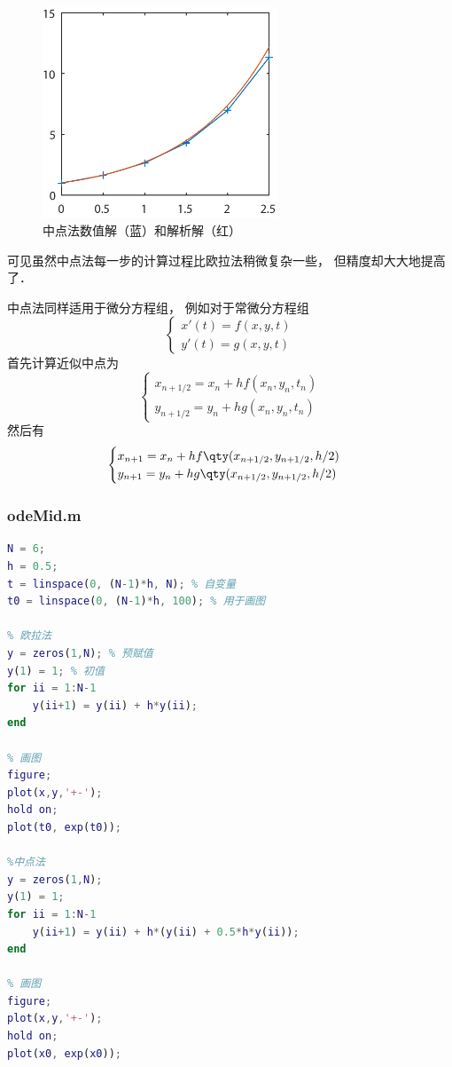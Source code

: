 \begin{figure}[ht]
\centering
\includegraphics[width=7cm]{./figures/OdeMid_2.pdf}
\caption{中点法数值解（蓝）和解析解（红）} \label{OdeMid_fig2}
\end{figure}

可见虽然中点法每一步的计算过程比欧拉法稍微复杂一些， 但精度却大大地提高了． 

中点法同样适用于微分方程组， 例如对于常微分方程组
\begin{equation}
\begin{cases}
x'(t) = f(x, y, t)\\
y'(t) = g(x, y, t)
\end{cases}
\end{equation}
首先计算近似中点为
\begin{equation}
\begin{cases}
x_{n+1/2} = x_n + h f(x_n, y_n, t_n)\\
y_{n+1/2} = y_n + h g(x_n, y_n, t_n)
\end{cases}
\end{equation}
然后有
\begin{equation}\label{OdeMid_eq7}
\begin{cases}
x_{n+1} = x_n + h f \qty(x_{n+1/2}, y_{n+1/2}, h/2)\\
y_{n+1} = y_n + h g \qty(x_{n+1/2}, y_{n+1/2}, h/2)
\end{cases}
\end{equation}

\subsubsection{odeMid.m}
\begin{lstlisting}[language=matlab]
% 设置参数
N = 6;
h = 0.5;
t = linspace(0, (N-1)*h, N); % 自变量
t0 = linspace(0, (N-1)*h, 100); % 用于画图

% 欧拉法
y = zeros(1,N); % 预赋值
y(1) = 1; % 初值
for ii = 1:N-1
    y(ii+1) = y(ii) + h*y(ii);
end

% 画图
figure;
plot(x,y,'+-');
hold on;
plot(t0, exp(t0));

%中点法
y = zeros(1,N);
y(1) = 1;
for ii = 1:N-1
    y(ii+1) = y(ii) + h*(y(ii) + 0.5*h*y(ii));
end

% 画图
figure;
plot(x,y,'+-');
hold on;
plot(x0, exp(x0));
\end{lstlisting}
